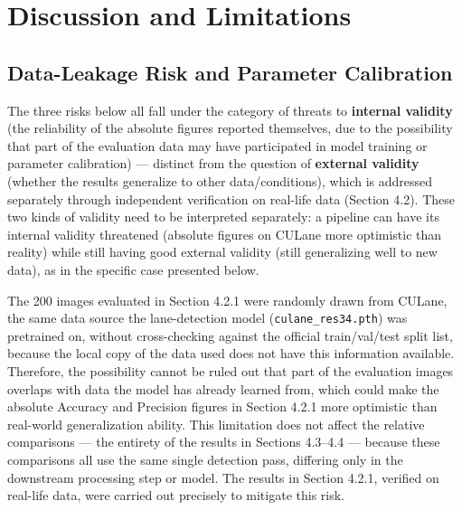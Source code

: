 \documentclass[12pt,a4paper]{report}
\begin{document}
\section{Discussion and Limitations}

\subsection{Data-Leakage Risk and Parameter Calibration}

The three risks below all fall under the category of threats to \textbf{internal validity} (the reliability of the absolute figures reported themselves, due to the possibility that part of the evaluation data may have participated in model training or parameter calibration) --- distinct from the question of \textbf{external validity} (whether the results generalize to other data/conditions), which is addressed separately through independent verification on real-life data (Section 4.2). These two kinds of validity need to be interpreted separately: a pipeline can have its internal validity threatened (absolute figures on CULane more optimistic than reality) while still having good external validity (still generalizing well to new data), as in the specific case presented below.

The 200 images evaluated in Section 4.2.1 were randomly drawn from CULane, the same data source the lane-detection model (\texttt{culane\_res34.pth}) was pretrained on, without cross-checking against the official train/val/test split list, because the local copy of the data used does not have this information available. Therefore, the possibility cannot be ruled out that part of the evaluation images overlaps with data the model has already learned from, which could make the absolute Accuracy and Precision figures in Section 4.2.1 more optimistic than real-world generalization ability. This limitation does not affect the relative comparisons --- the entirety of the results in Sections 4.3--4.4 --- because these comparisons all use the same single detection pass, differing only in the downstream processing step or model. The results in Section 4.2.1, verified on real-life data, were carried out precisely to mitigate this risk.
\end{document}
